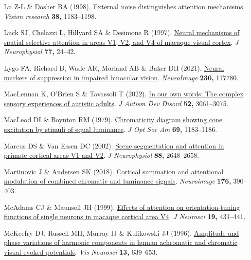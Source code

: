 \documentclass[
  letterpaper,
  DIV=11,
  numbers=noendperiod]{scrartcl}
\newlength{\cslhangindent}
\newenvironment{CSLReferences}[2] %
 {\begin{list}{}{%
  \setlength{\itemindent}{0pt}
  \setlength{\leftmargin}{0pt}
  \setlength{\parsep}{0pt}
  \ifodd #1
   \setlength{\leftmargin}{\cslhangindent}
   \setlength{\itemindent}{-1\cslhangindent}
  \fi
  \setlength{\itemsep}{#2\baselineskip}}}
 {\end{list}}
\begin{document}
\begin{CSLReferences}{1}{1}
Lu Z-L \& Dosher BA (1998). External noise distinguishes attention
mechanisms. \emph{Vision research} \textbf{38,} 1183--1198.

Luck SJ, Chelazzi L, Hillyard SA \& Desimone R (1997).
\href{https://doi.org/10.1152/jn.1997.77.1.24}{Neural mechanisms of
spatial selective attention in areas V1, V2, and V4 of macaque visual
cortex}. \emph{J Neurophysiol} \textbf{77,} 24--42.

Lygo FA, Richard B, Wade AR, Morland AB \& Baker DH (2021).
\href{https://doi.org/10.1016/j.neuroimage.2021.117780}{Neural markers
of suppression in impaired binocular vision}. \emph{NeuroImage}
\textbf{230,} 117780.

MacLennan K, O'Brien S \& Tavassoli T (2022).
\href{https://doi.org/10.1007/s10803-021-05186-3}{In our own words: The
complex sensory experiences of autistic adults}. \emph{J Autism Dev
Disord} \textbf{52,} 3061--3075.

MacLeod DI \& Boynton RM (1979).
\href{https://doi.org/10.1364/josa.69.001183}{Chromaticity diagram
showing cone excitation by stimuli of equal luminance}. \emph{J Opt Soc
Am} \textbf{69,} 1183--1186.

Marcus DS \& Van Essen DC (2002).
\href{https://doi.org/10.1152/jn.00916.2001}{Scene segmentation and
attention in primate cortical areas V1 and V2}. \emph{J Neurophysiol}
\textbf{88,} 2648--2658.

Martinovic J \& Andersen SK (2018).
\href{https://doi.org/10.1016/j.neuroimage.2018.04.066}{Cortical
summation and attentional modulation of combined chromatic and luminance
signals}. \emph{Neuroimage} \textbf{176,} 390--403.

McAdams CJ \& Maunsell JH (1999).
\href{https://doi.org/10.1523/JNEUROSCI.19-01-00431.1999}{Effects of
attention on orientation-tuning functions of single neurons in macaque
cortical area V4}. \emph{J Neurosci} \textbf{19,} 431--441.

McKeefry DJ, Russell MH, Murray IJ \& Kulikowski JJ (1996).
\href{https://doi.org/10.1017/s0952523800008543}{Amplitude and phase
variations of harmonic components in human achromatic and chromatic
visual evoked potentials}. \emph{Vis Neurosci} \textbf{13,} 639--653.


\end{CSLReferences}
\end{document}
